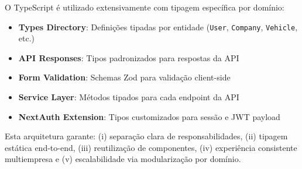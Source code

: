 O TypeScript é utilizado extensivamente com tipagem específica por domínio:

\begin{itemize}
  \item \textbf{Types Directory}: Definições tipadas por entidade (\texttt{User}, \texttt{Company}, \texttt{Vehicle}, etc.)
  \item \textbf{API Responses}: Tipos padronizados para respostas da API
  \item \textbf{Form Validation}: Schemas Zod para validação client-side
  \item \textbf{Service Layer}: Métodos tipados para cada endpoint da API
  \item \textbf{NextAuth Extension}: Tipos customizados para sessão e JWT payload
\end{itemize}

Esta arquitetura garante: (i) separação clara de responsabilidades, (ii) tipagem estática end-to-end, (iii) reutilização de componentes, (iv) experiência consistente multiempresa e (v) escalabilidade via modularização por domínio.
